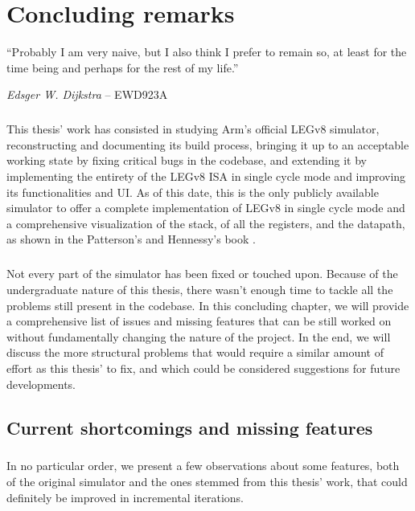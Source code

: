 \chapter{Concluding remarks}
\label{chap:concl}

\epigraph{``Probably I am very naive, but I also think I prefer to remain so, at least for the time being and perhaps for the rest of my life.''}{\textit{Edsger W. Dijkstra} -- EWD923A}

\paragraph{}
This thesis' work has consisted in studying Arm's official LEGv8 simulator, reconstructing and documenting its build process, bringing it up to an acceptable working state by fixing critical bugs in the codebase, and extending it by implementing the entirety of the LEGv8 ISA in single cycle mode and improving its functionalities and UI. As of this date, this is the only publicly available simulator to offer a complete implementation of LEGv8 in single cycle mode and a comprehensive visualization of the stack, of all the registers, and the datapath, as shown in the Patterson's and Hennessy's book \cite{patterson2016computer}.
\paragraph{}
Not every part of the simulator has been fixed or touched upon. Because of the undergraduate nature of this thesis, there wasn't enough time to tackle all the problems still present in the codebase. In this concluding chapter, we will provide a comprehensive list of issues and missing features that can be still worked on without fundamentally changing the nature of the project. In the end, we will discuss the more structural problems that would require a similar amount of effort as this thesis' to fix, and which could be considered suggestions for future developments.

\section{Current shortcomings and missing features}
\paragraph{}
In no particular order, we present a few observations about some features, both of the original simulator and the ones stemmed from this thesis' work, that could definitely be improved in incremental iterations.
